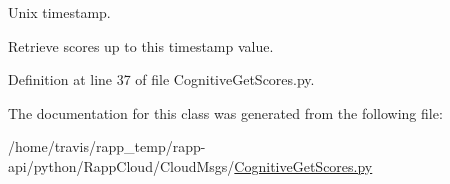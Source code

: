 Unix timestamp. 

Retrieve scores up to this timestamp value. 

Definition at line 37 of file Cognitive\-Get\-Scores.\-py.



The documentation for this class was generated from the following file\-:\begin{DoxyCompactItemize}
\item 
/home/travis/rapp\-\_\-temp/rapp-\/api/python/\-Rapp\-Cloud/\-Cloud\-Msgs/\hyperlink{CognitiveGetScores_8py}{Cognitive\-Get\-Scores.\-py}\end{DoxyCompactItemize}

